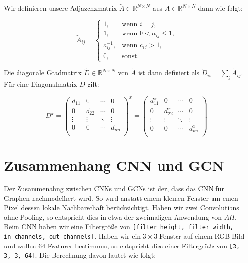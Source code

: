 \documentclass{scrartcl}
\begin{document}
Wir definieren unsere Adjazenzmatrix $\tilde A \in \mathbb{R}^{N \times N}$ aus $A \in \mathbb{R}^{N \times N}$ dann wie folgt:

\begin{equation}
  \tilde A_{ij} = \begin{cases}
    1, & \text{wenn }i=j\text{,}\\
    1, & \text{wenn }0 < a_{ij} \leq 1\text{,}\\
    a_{ij}^{-1}, & \text{wenn }a_{ij} > 1\text{,}\\
    0, & \text{sonst.}
  \end{cases}
\end{equation}


Die diagonale Gradmatrix $\tilde D \in \mathbb{R}^{N \times N}$ von $\tilde A$ ist dann definiert als $\tilde D_{ii} = \sum_j \tilde A_{ij}$.
Für eine Diagonalmatrix $D$ gilt:

\begin{equation}
  D^x = \begin{pmatrix}
    d_{11} & 0 & \cdots & 0\\
    0 & d_{22} & \cdots & 0\\
    \vdots & \vdots & \ddots & \vdots\\
    0 & 0 & \cdots & d_{nn}\\
  \end{pmatrix}^x = \begin{pmatrix}
    d_{11}^x & 0 & \cdots & 0\\
    0 & d_{22}^x & \cdots & 0\\
    \vdots & \vdots & \ddots & \vdots\\
    0 & 0 & \cdots & d_{nn}^x\\
  \end{pmatrix}
\end{equation}

\section{Zusammenhang CNN und GCN}

Der Zusammenahng zwischen CNNs und GCNs ist der, dass das CNN für Graphen nachmodelliert wird.
So wird anstatt einem kleinen Fenster um einen Pixel dessen lokale Nachbarschaft berücksichtigt.
Haben wir zwei Convolutions ohne Pooling, so entspricht dies in etwa der zweimaligen Anwendung von $AH$.
Beim CNN haben wir eine Filtergröße von \texttt{[filter\_height, filter\_width, in\_channels, out\_channels]}.
Haben wir ein $3 \times 3$ Fenster auf einem RGB Bild und wollen 64 Features bestimmen, so entspricht dies einer Filtergröße von \texttt{[3, 3, 3, 64]}.
Die Berechnung davon lautet wie folgt:
\end{document}
